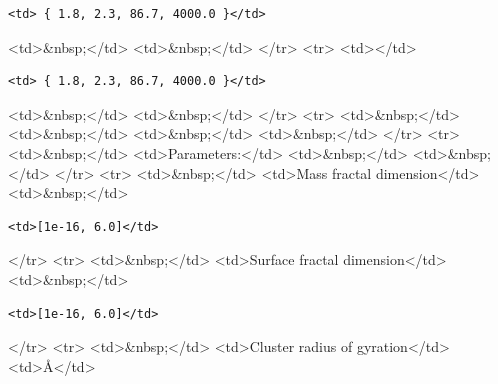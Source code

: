 \begin{verbatim}
<td> { 1.8, 2.3, 86.7, 4000.0 }</td>
\end{verbatim}

\textless{}td\textgreater{}\&nbsp;\textless{}/td\textgreater{} \textless{}td\textgreater{}\&nbsp;\textless{}/td\textgreater{} \textless{}/tr\textgreater{} \textless{}tr\textgreater{} \textless{}td\textgreater{}\textless{}/td\textgreater{}

\begin{verbatim}
<td> { 1.8, 2.3, 86.7, 4000.0 }</td>
\end{verbatim}

\textless{}td\textgreater{}\&nbsp;\textless{}/td\textgreater{} \textless{}td\textgreater{}\&nbsp;\textless{}/td\textgreater{} \textless{}/tr\textgreater{} \textless{}tr\textgreater{} \textless{}td\textgreater{}\&nbsp;\textless{}/td\textgreater{} \textless{}td\textgreater{}\&nbsp;\textless{}/td\textgreater{} \textless{}td\textgreater{}\&nbsp;\textless{}/td\textgreater{} \textless{}td\textgreater{}\&nbsp;\textless{}/td\textgreater{} \textless{}/tr\textgreater{} \textless{}tr\textgreater{} \textless{}td\textgreater{}\&nbsp;\textless{}/td\textgreater{} \textless{}td\textgreater{}Parameters:\textless{}/td\textgreater{} \textless{}td\textgreater{}\&nbsp;\textless{}/td\textgreater{} \textless{}td\textgreater{}\&nbsp;\textless{}/td\textgreater{} \textless{}/tr\textgreater{} \textless{}tr\textgreater{} \textless{}td\textgreater{}\&nbsp;\textless{}/td\textgreater{} \textless{}td\textgreater{}Mass fractal dimension\textless{}/td\textgreater{} \textless{}td\textgreater{}\&nbsp;\textless{}/td\textgreater{}

\begin{verbatim}
<td>[1e-16, 6.0]</td>
\end{verbatim}

\textless{}/tr\textgreater{} \textless{}tr\textgreater{} \textless{}td\textgreater{}\&nbsp;\textless{}/td\textgreater{} \textless{}td\textgreater{}Surface fractal dimension\textless{}/td\textgreater{} \textless{}td\textgreater{}\&nbsp;\textless{}/td\textgreater{}

\begin{verbatim}
<td>[1e-16, 6.0]</td>
\end{verbatim}

\textless{}/tr\textgreater{} \textless{}tr\textgreater{} \textless{}td\textgreater{}\&nbsp;\textless{}/td\textgreater{} \textless{}td\textgreater{}Cluster radius of gyration\textless{}/td\textgreater{} \textless{}td\textgreater{}\AA{}\textless{}/td\textgreater{}

